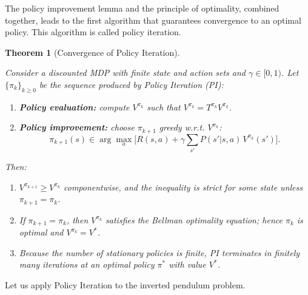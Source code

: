 \documentclass[
]{book}
\providecommand{\tightlist}{%
  \setlength{\itemsep}{0pt}\setlength{\parskip}{0pt}}
\newtheorem{theorem}{Theorem}[chapter]
\theoremstyle{definition}
\theoremstyle{definition}
\theoremstyle{definition}
\theoremstyle{definition}
\theoremstyle{remark}
\begin{document}
The policy improvement lemma and the principle of optimality, combined together, leads to the first algorithm that guarantees convergence to an optimal policy. This algorithm is called policy iteration.

\begin{theorem}[Convergence of Policy Iteration]
\protect\hypertarget{thm:PolicyIterationConvergence}{}\label{thm:PolicyIterationConvergence}

Consider a discounted MDP with finite state and action sets and \(\gamma\in[0,1)\). Let \(\{\pi_k\}_{k\ge0}\) be the sequence produced by \emph{Policy Iteration (PI)}:

\begin{enumerate}
\def\labelenumi{\arabic{enumi}.}
\tightlist
\item
  \textbf{Policy evaluation:} compute \(V^{\pi_k}\) such that \(V^{\pi_k}=T^{\pi_k}V^{\pi_k}\).
\item
  \textbf{Policy improvement:} choose \(\pi_{k+1}\) greedy w.r.t. \(V^{\pi_k}\):
  \[
  \pi_{k+1}(s) \in \arg\max_{a}\Big[ R(s,a)+\gamma\sum_{s'}P(s'|s,a)\,V^{\pi_k}(s')\Big].
  \]
\end{enumerate}

Then:

\begin{enumerate}
\def\labelenumi{\alph{enumi}.}
\item
  \(V^{\pi_{k+1}} \ge V^{\pi_k}\) componentwise, and the inequality is strict for some state unless \(\pi_{k+1}=\pi_k\).
\item
  If \(\pi_{k+1}=\pi_k\), then \(V^{\pi_k}\) satisfies the Bellman optimality equation; hence \(\pi_k\) is optimal and \(V^{\pi_k}=V^*\).
\item
  Because the number of stationary policies is finite, PI terminates in finitely many iterations at an optimal policy \(\pi^*\) with value \(V^*\).
\end{enumerate}

\end{theorem}

Let us apply Policy Iteration to the inverted pendulum problem.
\end{document}
